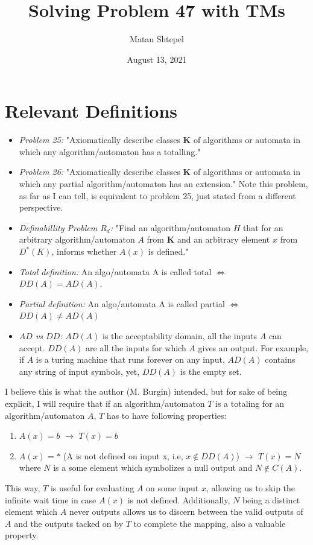 \documentclass{article}
\title{Solving Problem 47 with TMs}
\author{Matan Shtepel}
\date{August 13, 2021}
\newcommand{\titem}[1]{\item{}\textit{#1}} %
\newcommand{\K}{$\bm{K}$}
\newcommand{\aaa}{algorithm/automaton}
\begin{document}
\maketitle

\section{Relevant Definitions}
\begin{itemize}
    \titem{Problem 25:} "Axiomatically describe classes \K{} of algorithms or automata in which any algorithm/automaton has a totalling."
    \titem{Problem 26:} "Axiomatically describe classes \K{} of algorithms or automata in which any partial algorithm/automaton has an extension." Note this problem, as far as I can tell, is equivalent to problem 25, just stated from a different perspective. 
    \titem{Definabillity Problem $R_d$:} "Find an algorithm/automaton $H$ that for an arbitrary algorithm/automaton $A$ from \K{} and an arbitrary element $x$ from $D^*(K)$, informs whether $A(x)$ is defined."
    \titem{Total definition:} An algo/automata A is called total $\iff$ $DD(A)=AD(A)$.
    \titem{Partial definition:} An algo/automata A is called partial $\iff$ $DD(A)\neq{}AD(A)$
    \titem{$AD$ vs $DD$:} $AD(A)$ is the acceptability domain, all the inputs $A$ can accept. $DD(A)$ are all the inputs for which $A$ gives an output. For example, if $A$ is a turing machine that runs forever on any input, $AD(A)$ contains any string of input symbols, yet, $DD(A)$ is the empty set.   
\end{itemize}
I believe this is what the author (M. Burgin) intended, but for sake of being explicit, I will require that if an \aaa{} $T$ is a totaling for an \aaa{} $A$, $T$ has to have following properties:
\begin{enumerate}
    \item $A(x)=b$ $\rightarrow{}$ $T(x)=b$
    \item $A(x)=*$ (A is not defined on input x, i.e, $x\notin{}DD(A)$) $\rightarrow{}$ $T(x)=N$ where $N$ is a some element which symbolizes a null output and $N\notin{}C(A)$.
\end{enumerate}
This way, $T$ is useful for evaluating $A$ on some input $x$, allowing us to skip the infinite wait time in case $A(x)$ is not defined. Additionally, $N$ being a distinct element which $A$ never outputs allows us to discern between the valid outputs of $A$ and the outputs tacked on by $T$ to complete the mapping, also a valuable property. 
    
\end{document}
